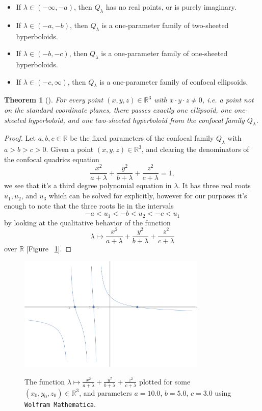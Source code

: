 \documentclass[12pt,a4paper]{article}
\theoremstyle{BoldTopSpacing}
\newtheorem{theorem}{Theorem}[section]
\theoremstyle{BoldTopSpacing}
\theoremstyle{BoldTopSpacing}
\theoremstyle{BoldTopBottomSpacing}
\theoremstyle{BoldTopSpacing}
\theoremstyle{BoldTopBottomSpacing}
\theoremstyle{remark}
\begin{document}
\begin{itemize}
    \item If $\lambda \in (-\infty, -a)$, then $Q_{\lambda}$ has no real points, or is purely imaginary.
    \item If $\lambda \in (-a, -b)$, then $Q_{\lambda}$ is a one-parameter family of two-sheeted hyperboloids.
    \item If $\lambda \in (-b, -c)$, then $Q_{\lambda}$ is a one-parameter family of one-sheeted hyperboloids.
    \item If $\lambda \in (-c, \infty)$, then $Q_{\lambda}$ is a one-parameter family of confocal ellipsoids. \par
\end{itemize}

\begin{theorem}[]
\label{thm:fill-up-euclidean-space}
For every point $(x, y, z) \in \mathbb{R}^3$ with $x \cdot y \cdot z \neq 0$, i.e. a point not on the standard coordinate planes, there passes exactly one ellipsoid, one one-sheeted hyperboloid, and one two-sheeted hyperboloid from the confocal family $Q_{\lambda}$.
\end{theorem}

\begin{proof}
    Let $a, b, c \in \mathbb{R}$ be the fixed parameters of the confocal family $Q_{\lambda}$ with $a > b > c > 0$. Given a point $(x, y, z) \in \mathbb{R}^3$, and clearing the denominators of the confocal quadrics equation
\[
    \frac{x^2}{a + \lambda} + \frac{y^2}{b + \lambda} + \frac{z^2}{c + \lambda} = 1,
\]
we see that it's a third degree polynomial equation in $\lambda$. It has three real roots $u_{1}, u_{2}$, and $u_{3}$ which can be solved for explicitly, however for our purposes it's enough to note that the three roots lie in the intervals
\[
    -a < u_{1} < -b < u_{2} < -c < u_{1}
\]
by looking at the qualitative behavior of the function
\[
    \lambda \mapsto \frac{x^2}{a + \lambda} + \frac{y^2}{b + \lambda} + \frac{z^2}{c + \lambda}
\]
over $\mathbb{R}$ [Figure ~\ref{fig:plot}].
\end{proof}

\begin{figure}[H]
    \centering
    \includegraphics[width=0.8\textwidth]{graph-for-proof.png}
    \label{fig:graph-for-proof}
    \caption{The function $\lambda \mapsto \frac{x^2}{a + \lambda} + \frac{y^2}{b + \lambda} + \frac{z^2}{c + \lambda}$ plotted for some $(x_0, y_0, z_0) \in \mathbb{R}^3$, and parameters $a = 10.0$, $b = 5.0$, $c = 3.0$ using \texttt{Wolfram Mathematica}.}
    \label{fig:plot}
\end{figure}
\end{document}
